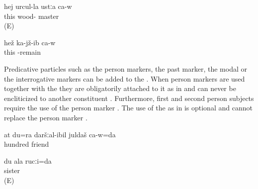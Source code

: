 \begin{exe}
	\ex	\label{ex:He is a carpenter}
	\gll	hej	urcul-la	ustːa	ca-w\\
		this	wood-	master	\\
	\glt	{} (E)

	\ex	\label{ex:He is sitting}
	\gll	hež	ka-jž-ib	ca-w\\
		this	-remain	\\
	\glt	{}
\end{exe}

Predicative particles such as the person markers, the past marker, the modal  or the interrogative markers can be added to the  . When person markers are used together with the  they are obligatorily attached to it as in  and can never be encliticized to another constituent . Furthermore, first and second person subjects require the use of the person marker . The use of the  as in  is optional and cannot replace the person marker .

\begin{exe}
	\ex	\label{ex:‎‎I am your 100th friend}
	\gll	at	du=ra	daršːal-ibil	juldaš	ca-w=da\\
				hundred	friend	\\
	\glt	{}



	\ex	\label{ex:ungrammaticalIamyoursisterA_1}
	\gll	du ala rucːi=da \\
				sister	\\
	\glt	{} (E)
	
	
\end{exe}

